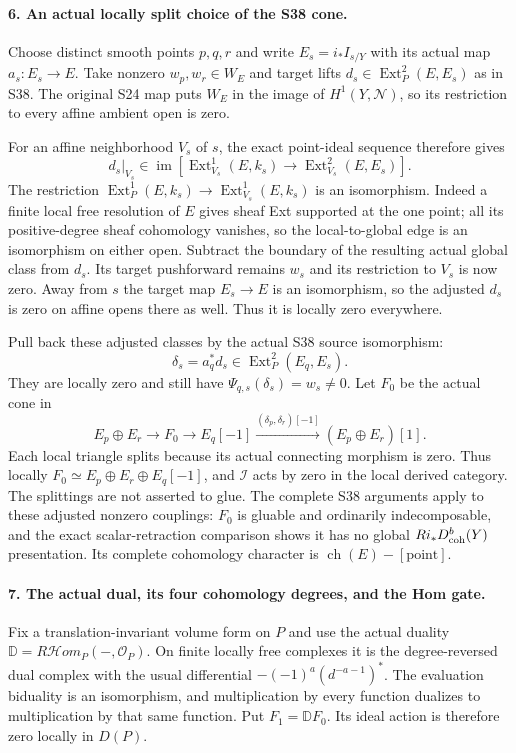 \paragraph{6. An actual locally split choice of the S38 cone.}
Choose distinct smooth points $p,q,r$ and write
$E_s=i_*I_{s/Y}$ with its actual map $a_s:E_s\to E$.
Take nonzero $w_p,w_r\in W_E$ and target lifts
$d_s\in\operatorname{Ext}^2_P(E,E_s)$ as in S38.
The original S24 map puts $W_E$ in the image of
$H^1(Y,\mathscr N)$, so its restriction to every
affine ambient open is zero.

For an affine neighborhood $V_s$ of $s$, the exact
point-ideal sequence therefore gives
\[
 d_s|_{V_s}\in\operatorname{im}
       [\operatorname{Ext}^1_{V_s}(E,k_s)
                    \longrightarrow\operatorname{Ext}^2_{V_s}(E,E_s)].
 \tag{F1S40.20}
\]
The restriction
$\operatorname{Ext}^1_P(E,k_s)\to
\operatorname{Ext}^1_{V_s}(E,k_s)$ is an isomorphism.
Indeed a finite local free resolution of $E$ gives
sheaf Ext supported at the one point; all its
positive-degree sheaf cohomology vanishes, so the
local-to-global edge is an isomorphism on either
open. Subtract the boundary of the resulting
actual global class from $d_s$.
Its target pushforward remains $w_s$ and its
restriction to $V_s$ is now zero. Away from $s$
the target map $E_s\to E$ is an isomorphism,
so the adjusted $d_s$ is zero on affine opens
there as well. Thus it is locally zero everywhere.

Pull back these adjusted classes by the actual
S38 source isomorphism:
\[
          \delta_s=a_q^*d_s
                    \in\operatorname{Ext}^2_P(E_q,E_s).
\]
They are locally zero and still have
$\Psi_{q,s}(\delta_s)=w_s\ne0$.
Let $F_0$ be the actual cone in
\[
 E_p\oplus E_r\longrightarrow F_0\longrightarrow E_q[-1]
          \xrightarrow{(\delta_p,\delta_r)[-1]}(E_p\oplus E_r)[1].
 \tag{F1S40.21}
\]
Each local triangle splits because its actual
connecting morphism is zero. Thus locally
$F_0\simeq E_p\oplus E_r\oplus E_q[-1]$,
and $\mathcal I$ acts by zero in the local
derived category. The splittings are not
asserted to glue. The complete S38 arguments
apply to these adjusted nonzero couplings:
$F_0$ is gluable and ordinarily indecomposable,
and the exact scalar-retraction comparison
shows it has no global $Ri_*D^b_{\rm coh}(Y)$
presentation. Its complete cohomology character
is $\operatorname{ch}(E)-[\mathrm{point}]$.

\paragraph{7. The actual dual, its four cohomology degrees, and the Hom gate.}
Fix a translation-invariant volume form on $P$
and use the actual duality
$\mathbb D=R\mathcal Hom_P(-,\mathcal O_P)$.
On finite locally free complexes it is the
degree-reversed dual complex with the usual
differential $-(-1)^a(d^{-a-1})^*$.
The evaluation biduality is an isomorphism,
and multiplication by every function dualizes
to multiplication by that same function.
Put $F_1=\mathbb D F_0$. Its ideal action is
therefore zero locally in $D(P)$.

